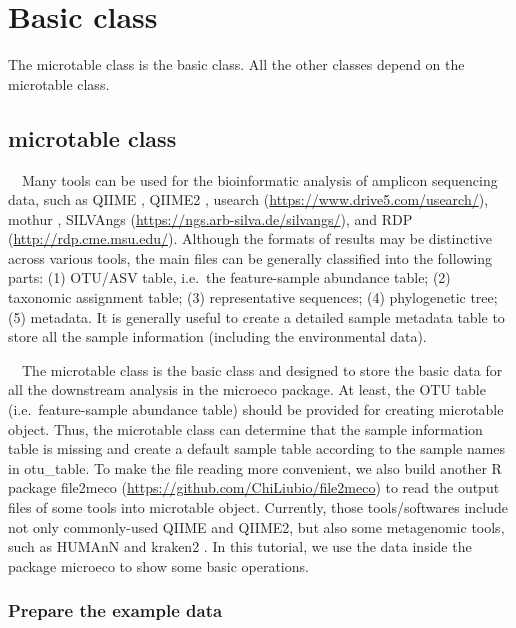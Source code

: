 \documentclass[
]{book}
\begin{document}
\hypertarget{basic-class}{%
\chapter{Basic class}\label{basic-class}}

The microtable class is the basic class.
All the other classes depend on the microtable class.

\hypertarget{microtable-class}{%
\section{microtable class}\label{microtable-class}}

　Many tools can be used for the bioinformatic analysis of amplicon sequencing data, such as QIIME \citep{Caporaso_QIIME_2010}, QIIME2 \citep{Bolyen_Reproducible_2019},
usearch (\url{https://www.drive5.com/usearch/}), mothur \citep{Schloss_Introducing_2009},
SILVAngs (\url{https://ngs.arb-silva.de/silvangs/}),
and RDP (\url{http://rdp.cme.msu.edu/}).
Although the formats of results may be distinctive across various tools, the main files can be generally classified into the following parts:
(1) OTU/ASV table, i.e.~the feature-sample abundance table;
(2) taxonomic assignment table;
(3) representative sequences;
(4) phylogenetic tree;
(5) metadata. It is generally useful to create a detailed sample metadata table to store all the sample information (including the environmental data).

　The microtable class is the basic class and designed to store the basic data for all the downstream analysis in the microeco package.
At least, the OTU table (i.e.~feature-sample abundance table) should be provided for creating microtable object.
Thus, the microtable class can determine that the sample information table is missing and create a default sample table according to
the sample names in otu\_table.
To make the file reading more convenient,
we also build another R package file2meco (\url{https://github.com/ChiLiubio/file2meco}) to read the output files of some tools into microtable object.
Currently, those tools/softwares include not only commonly-used QIIME \citep{Caporaso_QIIME_2010} and QIIME2\citep{Bolyen_Reproducible_2019},
but also some metagenomic tools, such as HUMAnN \citep{Franzosa_Species_2018} and kraken2 \citep{Wood_Improved_2019}.
In this tutorial, we use the data inside the package microeco to show some basic operations.

\hypertarget{prepare-the-example-data}{%
\subsection{Prepare the example data}\label{prepare-the-example-data}}
\end{document}

